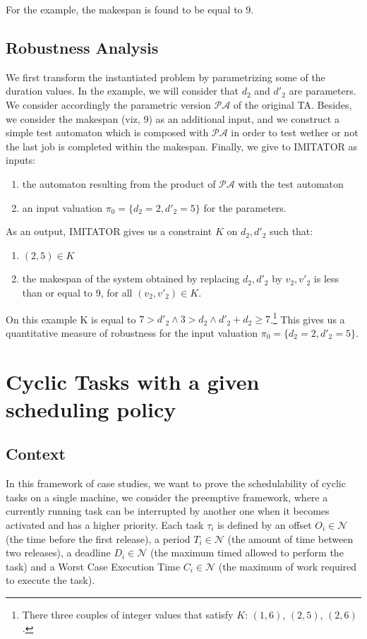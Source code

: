 \documentclass{article}
\begin{document}
For the example, the makespan is found to be equal to 9.

\subsection{Robustness Analysis}
We first transform the instantiated problem by parametrizing some of the duration values. In the example, we will consider that $d_2$ and $d'_2$ are parameters. We consider accordingly
 the parametric version $\mathcal{PA}$ of the original TA. Besides, we consider the makespan (viz, 9) as an additional input, and we construct a simple test automaton which is composed with $\mathcal{PA}$ in order to test wether or not the 
last job is completed within the makespan.
Finally, we give to IMITATOR as inputs:
\begin{enumerate}
 \item  the automaton resulting from the product of $\mathcal{PA}$ with the test automaton
 \item  an input valuation $\pi_0 = \{d_2=2, d'_2 = 5\}$ for the parameters.
\end{enumerate}
As an output, IMITATOR gives us a constraint $K$ on $d_2, d'_2$ such that: 
\begin{enumerate}
 \item $(2,5) \in K$
 \item the makespan of the system obtained by replacing $d_2, d'_2$ by $v_2, v'_2$ is less than or equal to 9, for all $(v_2,v'_2) \in K$.
\end{enumerate}
On this example K is equal to $ 7 > d'_2 \wedge 3 > d_2 \wedge d'_2 + d_2 \geq 7$.\footnote{There three couples of integer values that satisfy $K$: $(1,6)$, $(2,5)$, $(2,6)$.} This gives us a quantitative
 measure of robustness for the input valuation $\pi_0 = \{d_2=2, d'_2 = 5\}$.

\section{Cyclic Tasks with a given scheduling policy}
\subsection{Context}
In this framework of case studies, we want to prove the schedulability of cyclic tasks on a single machine, we consider the preemptive framework, where a currently running task
can be interrupted by another one when it becomes activated and has a higher priority. Each task $\tau_i$ is defined by an offset $O_i \in \mathcal{N}$ (the time before the first release), 
a period $T_i \in \mathcal{N}$ (the amount of time between two releases), a deadline $D_i \in \mathcal{N} $ (the maximum timed allowed to perform the task) and a Worst Case Execution Time $C_i \in \mathcal{N}$ (the maximum of work required to 
execute the task).
\end{document}
